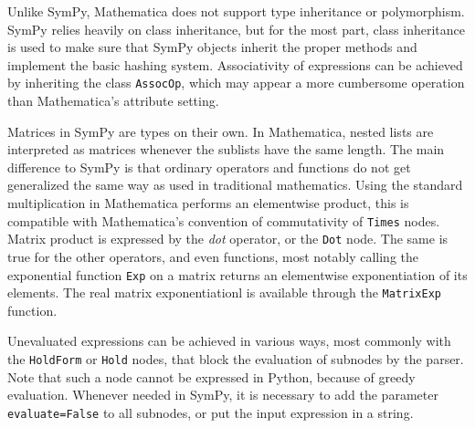 

Unlike SymPy, Mathematica does not support type inheritance or polymorphism\cite{Fateman1992}.
%
SymPy relies heavily on class inheritance, but for the most part,
class inheritance is used to make sure that SymPy objects inherit the proper
methods and implement the basic hashing system.
Associativity of expressions can be achieved by inheriting the class \texttt{AssocOp},
which may appear a more cumbersome operation than Mathematica's attribute setting.


Matrices in SymPy are types on their own.
In Mathematica, nested lists are interpreted as matrices whenever the sublists
have the same length.
The main difference to SymPy is that ordinary operators and functions
do not get generalized the same way as used in traditional mathematics.
Using the standard multiplication in Mathematica performs an elementwise
product, this is compatible with Mathematica's convention of commutativity of
\texttt{Times} nodes.
Matrix product is expressed by the \textit{dot} operator,
or the \texttt{Dot} node.
The same is true for the other operators, and even functions,
most notably calling the exponential function \texttt{Exp} on a matrix
returns an elementwise exponentiation of its elements.
The real matrix exponentiationl is available through the \texttt{MatrixExp}
function.


Unevaluated expressions can be achieved in various ways,
most commonly with the \texttt{HoldForm} or \texttt{Hold} nodes,
that block the evaluation of subnodes by the parser.
Note that such a node cannot be expressed in Python, because of greedy evaluation.
Whenever needed in SymPy, it is necessary to add the parameter \texttt{evaluate=False}
to all subnodes, or put the input expression in a string.


